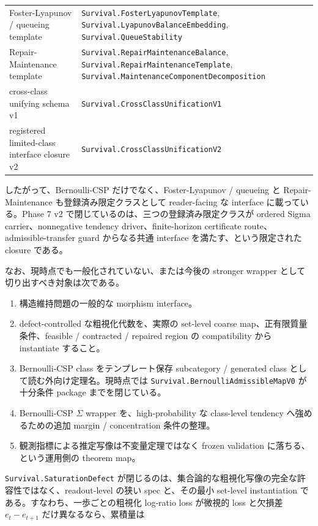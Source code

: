\documentclass[12pt,a4paper]{article}
\begin{document}
{\begin{longtable}[]{@{}
  >{\raggedright\arraybackslash}p{}
  >{\raggedright\arraybackslash}p{}@{}}
Foster-Lyapunov / queueing template & \texttt{Survival.FosterLyapunovTemplate}, \texttt{Survival.LyapunovBalanceEmbedding}, \texttt{Survival.QueueStability} \\
Repair-Maintenance template & \texttt{Survival.RepairMaintenanceBalance}, \texttt{Survival.RepairMaintenanceTemplate}, \texttt{Survival.MaintenanceComponentDecomposition} \\
cross-class unifying schema v1 & \texttt{Survival.CrossClassUnificationV1} \\
registered limited-class interface closure v2 & \texttt{Survival.CrossClassUnificationV2} \\
\end{longtable}
}

したがって、Bernoulli-CSP だけでなく、Foster-Lyapunov / queueing と Repair-Maintenance も登録済み限定クラスとして reader-facing な interface に載っている。Phase 7 v2 で閉じているのは、三つの登録済み限定クラスが ordered Sigma carrier、nonnegative tendency driver、finite-horizon certificate route、admissible-transfer guard からなる共通 interface を満たす、という限定された closure である。

なお、現時点でも一般化されていない、または今後の stronger wrapper として切り出すべき対象は次である。

\begin{enumerate}
\def\labelenumi{\arabic{enumi}.}
\tightlist
\item
  構造維持問題の一般的な morphism interface。
\item
  defect-controlled な粗視化代数を、実際の set-level coarse map、正有限質量条件、feasible / contracted / repaired region の compatibility から instantiate すること。
\item
  Bernoulli-CSP class をテンプレート保存 subcategory / generated class として読む外向け定理名。現時点では \texttt{Survival.BernoulliAdmissibleMapV0} が十分条件 package までを閉じている。
\item
  Bernoulli-CSP \(\Sigma\) wrapper を、high-probability な class-level tendency へ強めるための追加 margin / concentration 条件の整理。
\item
  観測指標による推定写像は不変量定理ではなく frozen validation に落ちる、という運用側の theorem map。
\end{enumerate}

\texttt{Survival.SaturationDefect} が閉じるのは、集合論的な粗視化写像の完全な許容性ではなく、readout-level の狭い spec と、その最小 set-level instantiation である。すなわち、一歩ごとの粗視化 log-ratio loss が微視的 loss と欠損差 \(e_{t}-e_{t+1}\) だけ異なるなら、累積量は
\end{document}
